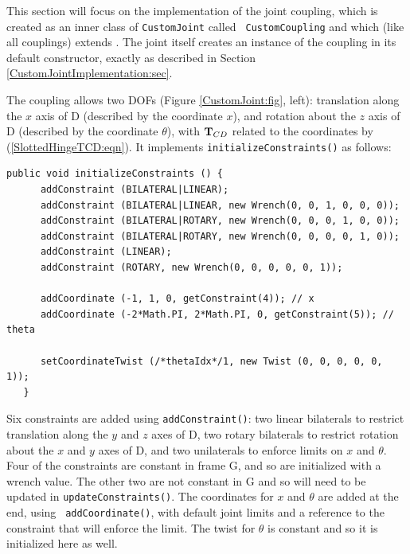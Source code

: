 This section will focus on the implementation of the joint coupling,
which is created as an inner class of {\tt CustomJoint} called {\tt
CustomCoupling} and which (like all couplings) extends
. The joint
itself creates an instance of the coupling in its default constructor,
exactly as described in Section
\ref{CustomJointImplementation:sec}.

The coupling allows two DOFs (Figure \ref{CustomJoint:fig}, left):
translation along the $x$ axis of D (described by the coordinate $x$),
and rotation about the $z$ axis of D (described by the coordinate
$\theta$), with ${\bf T}_{CD}$ related to the coordinates by
(\ref{SlottedHingeTCD:eqn}). It implements
{\tt initializeConstraints()} as follows:
%
\begin{lstlisting}[]
   public void initializeConstraints () {
      addConstraint (BILATERAL|LINEAR);
      addConstraint (BILATERAL|LINEAR, new Wrench(0, 0, 1, 0, 0, 0));
      addConstraint (BILATERAL|ROTARY, new Wrench(0, 0, 0, 1, 0, 0));
      addConstraint (BILATERAL|ROTARY, new Wrench(0, 0, 0, 0, 1, 0));
      addConstraint (LINEAR);
      addConstraint (ROTARY, new Wrench(0, 0, 0, 0, 0, 1));
   
      addCoordinate (-1, 1, 0, getConstraint(4)); // x
      addCoordinate (-2*Math.PI, 2*Math.PI, 0, getConstraint(5)); // theta

      setCoordinateTwist (/*thetaIdx*/1, new Twist (0, 0, 0, 0, 0, 1));
   }
\end{lstlisting}
%
Six constraints are added using {\tt addConstraint()}: two linear bilaterals to
restrict translation along the $y$ and $z$ axes of D, two rotary bilaterals to
restrict rotation about the $x$ and $y$ axes of D, and two unilaterals to
enforce limits on $x$ and $\theta$. Four of the constraints are constant in
frame G, and so are initialized with a wrench value. The other two are not
constant in G and so will need to be updated in {\tt updateConstraints()}. The
coordinates for $x$ and $\theta$ are added at the end, using {\tt
addCoordinate()}, with default joint limits and a reference to the constraint
that will enforce the limit. The twist for $\theta$ is constant and so it is
initialized here as well.


